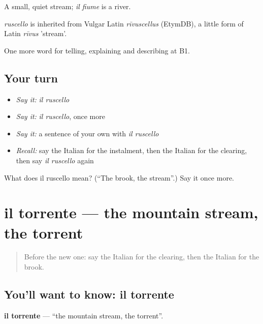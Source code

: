 A small, quiet stream; \emph{il fiume} is a river.

\begin{cousinweb}
\emph{ruscello} is inherited from Vulgar Latin \emph{rīvuscellus} (EtymDB), a little form of Latin \emph{rīvus} 'stream'.
\end{cousinweb}

\begin{grammarlens}[title={What you've built}]
One more word for telling, explaining and describing at B1.
\end{grammarlens}

\subsection*{Your turn}
\begin{itemize}
\raggedright
  \item \emph{Say it:} \emph{il ruscello}
  \item \emph{Say it:} \emph{il ruscello}, once more
  \item \emph{Say it:} a sentence of your own with \emph{il ruscello}
  \item \emph{Recall:} say the Italian for the instalment, then the Italian for the clearing, then say \emph{il ruscello} again
\end{itemize}

\begin{tcolorbox}[breakable,colback=teal!4,colframe=teal!35!black,title={Before you move on}]
What does il ruscello mean? (\textquotedblleft{}The brook, the stream\textquotedblright{}.) Say it once more.
\end{tcolorbox}
\section[il torrente]{il torrente — the mountain stream, the torrent}

\label{lesson:IT-C460-torrente}



\begin{quote}
Before the new one: say the Italian for the clearing, then the Italian for the brook.
\end{quote}

\subsection*{You'll want to know: il torrente}
\textbf{il torrente} — \textquotedblleft{}the mountain stream, the torrent\textquotedblright{}.

